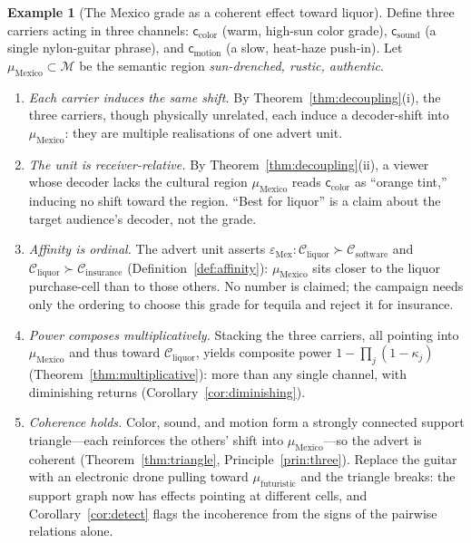 \documentclass[twocolumn,11pt,a4paper]{article}
\theoremstyle{adv}
\theoremstyle{definition}
\newtheorem{example}[theorem]{Example}
\theoremstyle{remark}
\newcommand{\Cell}{\mathcal{C}}        %
\newcommand{\Eff}{\varepsilon}        %
\newcommand{\Carrier}{\kappa}         %
\renewcommand{\Carrier}{\mathsf{c}}
\newcommand{\Mean}{\mathcal{M}}        %
\newcommand{\pot}{\kappa}             %
\begin{document}
\begin{example}[The Mexico grade as a coherent effect toward liquor]
\label{ex:mexico}
Define three carriers acting in three channels:
$\Carrier_{\text{color}}$ (warm, high-sun color grade),
$\Carrier_{\text{sound}}$ (a single nylon-guitar phrase), and
$\Carrier_{\text{motion}}$ (a slow, heat-haze push-in). Let
$\mu_{\text{Mexico}}\subset\Mean$ be the semantic region
\emph{sun-drenched, rustic, authentic}.

\begin{enumerate}[label=(\arabic*),leftmargin=1.6em,itemsep=2pt]
\item \emph{Each carrier induces the same shift.} By
  Theorem~\ref{thm:decoupling}(i), the three carriers, though physically
  unrelated, each induce a decoder-shift into $\mu_{\text{Mexico}}$: they
  are multiple realisations of one advert unit.
\item \emph{The unit is receiver-relative.} By
  Theorem~\ref{thm:decoupling}(ii), a viewer whose decoder lacks the
  cultural region $\mu_{\text{Mexico}}$ reads $\Carrier_{\text{color}}$ as
  ``orange tint,'' inducing no shift toward the region. ``Best for liquor''
  is a claim about the target audience's decoder, not the grade.
\item \emph{Affinity is ordinal.} The advert unit asserts
  $\Eff_{\text{Mex}}:\Cell_{\text{liquor}}\succ\Cell_{\text{software}}$ and
  $\Cell_{\text{liquor}}\succ\Cell_{\text{insurance}}$
  (Definition~\ref{def:affinity}): $\mu_{\text{Mexico}}$ sits closer to the
  liquor purchase-cell than to those others. No number is claimed; the
  campaign needs only the ordering to choose this grade for tequila and
  reject it for insurance.
\item \emph{Power composes multiplicatively.} Stacking the three carriers,
  all pointing into $\mu_{\text{Mexico}}$ and thus toward
  $\Cell_{\text{liquor}}$, yields composite power
  $1-\prod_{j}(1-\pot_j)$ (Theorem~\ref{thm:multiplicative}): more than any
  single channel, with diminishing returns
  (Corollary~\ref{cor:diminishing}).
\item \emph{Coherence holds.} Color, sound, and motion form a strongly
  connected support triangle---each reinforces the others' shift into
  $\mu_{\text{Mexico}}$---so the advert is coherent
  (Theorem~\ref{thm:triangle}, Principle~\ref{prin:three}). Replace the
  guitar with an electronic drone pulling toward
  $\mu_{\text{futuristic}}$ and the triangle breaks: the support graph now
  has effects pointing at different cells, and
  Corollary~\ref{cor:detect} flags the incoherence from the signs of the
  pairwise relations alone.
\end{enumerate}
\end{example}
\end{document}
